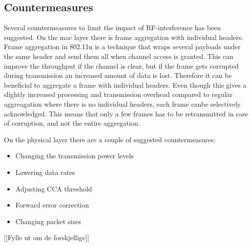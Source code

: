{	\subsection{Countermeasures}
	Several countermeasures to limit the impact of RF-interference has been suggested.
	On the mac layer there is frame aggregation with individual headers.
	Frame aggregation in 802.11n is a technique that wraps several payloads under the same
	header and send them all when channel access is granted. This can improve the throughput
	if the channel is clear, but if the frame gets corrupted during transmission
	an increased amount of data is lost.
	Therefore it can be beneficial to aggregate a frame with individual headers.
	Even though this gives a slightly increased processing and transmission overhead
	compared to regular aggreagation where there is no individual headers, 
	each frame canbe selectively acknowledged.
	This means that only a few frames has to be retransmitted in case of corruption,
	and not the entire aggregation. 

	On the physical layer there are a couple of suggested countermeasures:
	\begin{itemize}
	\item Changing the transmission power levels
	\item Lowering data rates
	\item Adjusting CCA threshold
	\item Forward error correction
	\item Changing packet sizes
	\end{itemize}
	[[Fylle ut om de forskjellige]]



}
